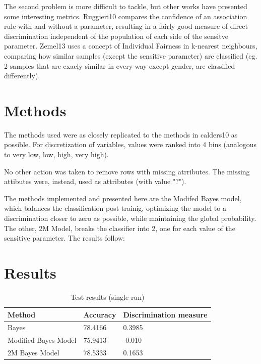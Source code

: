 \documentclass[paper=a4, fontsize=11pt]{scrartcl} %
\numberwithin{equation}{section} %
\numberwithin{figure}{section} %
\numberwithin{table}{section} %
\begin{document}
The second problem is more difficult to tackle, but other works have presented some interesting metrics. Ruggieri10 \cite{Ruggieri10} compares the confidence of an association rule with and without a parameter, resulting in a fairly good measure of direct discrimination independent of the population of each side of the sensitve parameter. Zemel13 \cite{Zemel13} uses a concept of Individual Fairness in k-nearest neighbours, comparing how similar samples (except the sensitive parameter) are classified (eg. 2 samples that are exacly similar in every way except gender, are classified differently).

\section{Methods}
The methods used were as closely replicated to the methods in calders10 \cite{calders10} as possible. For discretization of variables, values were ranked into 4 bins (analogous to very low, low, high, very high).

No other  action was taken to remove rows with missing atrributes. The missing attibutes were, instead, used as attributes (with value "?"). 

The methods implemented and presented here are the Modifed Bayes model, which balances the classification post trainig, optimizing the model to a discrimination closer to zero as possible, while maintaining the global probability. The other, 2M Model, breaks the classifier into 2, one for each value of the sensitive parameter. The results follow: 

\section{Results}
\begin{table}[hb]
\begin{center}
    \begin{tabular}{|l|l|l|}
    \hline
    \textbf{Method }                   & \textbf{Accuracy} & \textbf{Discrimination measure} \\ \hline
    Bayes                & 78.4166  & 0.3985                 \\ \hline
    Modified Bayes Model & 75.9413  & -0.010                 \\ \hline
    2M Bayes  Model      & 78.5333  & 0.1653                 \\ \hline
    \end{tabular}
    \caption {Test results (single run)}
    
\end{center}
\end{table}
\end{document}
